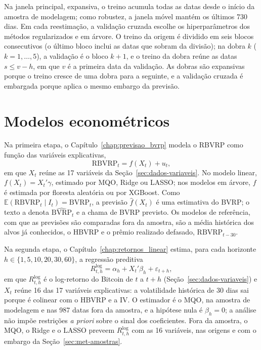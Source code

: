 Na janela principal, expansiva, o treino acumula todas as datas desde o início
da amostra de modelagem; como robustez, a janela móvel mantém os últimos 730
dias. Em cada reestimação, a validação cruzada escolhe os hiperparâmetros dos
métodos regularizados e em árvore. O treino da origem é dividido em seis
blocos consecutivos (o último bloco inclui as datas que sobram da divisão); na
dobra $k$ ($k = 1, \ldots, 5$), a validação é o bloco $k+1$, e o treino da
dobra reúne as datas $s \le v - h$, em que $v$ é a primeira data da validação.
As dobras são expansivas porque o treino cresce de uma dobra para a seguinte,
e a validação cruzada é embargada porque aplica o mesmo embargo da previsão.

\section{Modelos econométricos}
\label{sec:met-modelos}

Na primeira etapa, o Capítulo~\ref{chap:previsao_bvrp} modela o RBVRP como função das variáveis
explicativas,
\begin{equation}
\text{RBVRP}_t = f(X_t) + u_t,
\label{eq:met-previsao-bvrp}
\end{equation}
em que $X_t$ reúne as 17 variáveis da Seção~\ref{sec:dados-variaveis}. No
modelo linear, $f(X_t) = X_t'\gamma$, estimado por MQO, Ridge ou LASSO; nos
modelos em árvore, $f$ é estimada por floresta aleatória ou por XGBoost.
Como $\mathbb{E}(\text{RBVRP}_t \mid I_t) = \text{BVRP}_t$, a previsão
$\hat f(X_t)$ é uma estimativa do BVRP; o texto a denota
$\widehat{\text{BVRP}}_t$ e a chama de BVRP previsto.
Os modelos de referência, com que as previsões são comparadas fora da
amostra, são a média histórica dos alvos já conhecidos, o HBVRP e o prêmio
realizado defasado, $\text{RBVRP}_{t-30}$.

Na segunda etapa, o Capítulo~\ref{chap:retornos_linear} estima, para cada
horizonte $h \in \{1, 5, 10, 20, 30, 60\}$, a regressão preditiva
\begin{equation}
R^{\log}_{t,h} = \alpha_h + X_t'\beta_h + \varepsilon_{t+h},
\label{eq:met-retorno-direto}
\end{equation}
em que $R^{\log}_{t,h}$ é o log-retorno do Bitcoin de $t$ a $t+h$
(Seção~\ref{sec:dados-variaveis}) e $X_t$ reúne 16 das 17 variáveis
explicativas: a volatilidade histórica de 30 dias sai porque é colinear com o
HBVRP e a IV. O estimador é o MQO, na amostra de modelagem e nas 987 datas
fora da amostra, e a hipótese nula é $\beta_h = 0$; a análise não impõe
restrições \textit{a priori} sobre o sinal dos coeficientes. Fora da amostra,
o MQO, o Ridge e o LASSO preveem $R^{\log}_{t,h}$ com as 16 variáveis, nas
origens e com o embargo da Seção~\ref{sec:met-amostras}.

